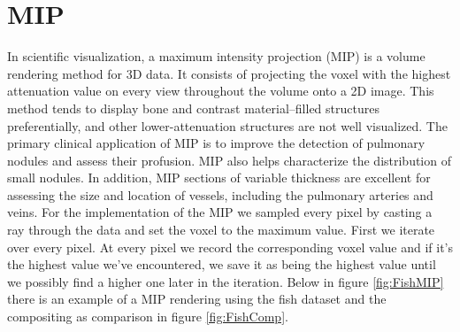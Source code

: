 \documentclass[a4paper,twoside,11pt]{article}
\begin{document}
\section{MIP}
In scientific visualization, a maximum intensity projection (MIP) is a volume rendering method for 3D data. It consists of projecting the voxel with the highest attenuation value on every view throughout the volume onto a 2D image. \newline
This method tends to display bone and contrast material–filled structures preferentially, and other lower-attenuation structures are not well visualized. The primary clinical application of MIP is to improve the detection of pulmonary nodules and assess their profusion. MIP also helps characterize the distribution of small nodules. In addition, MIP sections of variable thickness are excellent for assessing the size and location of vessels, including the pulmonary arteries and veins. \newline
For the implementation of the MIP we sampled every pixel by casting a ray through the data and set the voxel to the maximum value. First we iterate over every pixel. At every pixel we record the corresponding voxel value and if it's the highest value we've encountered, we save it as being the highest value until we possibly find a higher one later in the iteration. \newline
Below in figure \ref{fig:FishMIP} there is an example of a MIP rendering using the fish dataset and the compositing as comparison in figure \ref{fig:FishComp}.
\end{document}
